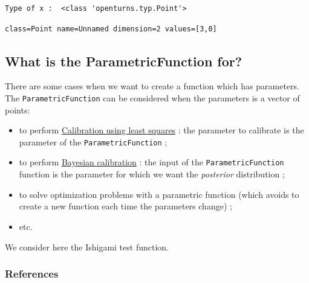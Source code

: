 \documentclass[11pt]{article}
\makeatletter
\providecommand{\tightlist}{%
      \setlength{\itemsep}{0pt}\setlength{\parskip}{0pt}}
\newcommand{\boxspacing}{\kern\kvtcb@left@rule\kern\kvtcb@boxsep}
\newcommand{\prompt}[4]{
        {\ttfamily\llap{{\color{#2}[#3]:\hspace{3pt}#4}}\vspace{-\baselineskip}}
    }
\makeatother
\begin{document}
    \begin{Verbatim}[commandchars=\\\{\}]
Type of x :  <class 'openturns.typ.Point'>
    \end{Verbatim}

            \begin{tcolorbox}[breakable, size=fbox, boxrule=.5pt, pad at break*=1mm, opacityfill=0]
\prompt{Out}{outcolor}{5}{\boxspacing}
\begin{Verbatim}[commandchars=\\\{\}]
class=Point name=Unnamed dimension=2 values=[3,0]
\end{Verbatim}
\end{tcolorbox}
        
    \hypertarget{what-is-the-parametricfunction-for}{%
\subsection{What is the ParametricFunction
for?}\label{what-is-the-parametricfunction-for}}

There are some cases when we want to create a function which has
parameters. The \texttt{ParametricFunction} can be considered when the
parameters is a vector of points:

\begin{itemize}
\tightlist
\item
  to perform
  \href{https://openturns.github.io/openturns/latest/auto_calibration/least_squares_and_gaussian_calibration/plot_calibration_deflection_tube.html\#sphx-glr-auto-calibration-least-squares-and-gaussian-calibration-plot-calibration-deflection-tube-py}{Calibration
  using least squares} : the parameter to calibrate is the parameter of
  the \texttt{ParametricFunction} ;
\item
  to perform
  \href{https://openturns.github.io/openturns/latest/auto_calibration/bayesian_calibration/plot_bayesian_calibration_flooding.html}{Bayesian
  calibration} : the input of the \texttt{ParametricFunction} function
  is the parameter for which we want the \emph{posterior} distribution ;
\item
  to solve optimization problems with a parametric function (which
  avoids to create a new function each time the parameters change) ;
\item
  etc.
\end{itemize}

We consider here the Ishigami test function.

\hypertarget{references}{%
\subsubsection{References}\label{references}}
\end{document}
